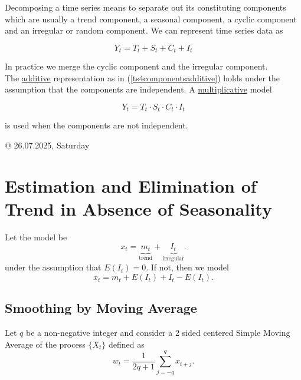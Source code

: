 \documentclass[11pt, a4paper]{article}
\numberwithin{equation}{section}
\theoremstyle{definition}
\begin{document}
Decomposing a time series means to separate out its constituting components which are usually a trend component, a seasonal component, a cyclic component and an irregular or random component. We can represent time series data as

\begin{equation}\label{ts4componentsadditive}
Y_t = T_t + S_t + C_t + I_t
\end{equation}

In practice we merge the cyclic component and the irregular component.\\[0.1em]

The \underline{additive} representation as in (\ref{ts4componentsadditive}) holds under the assumption that the components are independent. A \underline{multiplicative} model

\begin{equation}\label{ts4componentsmultiplicative}
Y_t = T_t \cdot S_t \cdot C_t \cdot I_t
\end{equation}

is used when the components are not independent.

\begin{flushright}
\textcolor{col2}{@ 26.07.2025, Saturday}
\end{flushright}

\newpage
\section{Estimation and Elimination of Trend in Absence of Seasonality}

Let the model be
\begin{equation*}
x_t = \underbrace{m_t}_{\text{trend}} + \underbrace{I_t}_{\text{irregular}}.
\end{equation*}
under the assumption that $E(I_t) = 0$. If not, then we model
\begin{equation*}
x_t = m_t + E(I_t) + I_t - E(I_t).
\end{equation*}

\subsection{Smoothing by Moving Average}

Let $q$ be a non-negative integer and consider a 2 sided centered Simple Moving Average of the process $\{X_t\}$ defined as
\begin{equation*}
w_t = \dfrac{1}{2q+1} \sum \limits_{j = -q}^{q} x_{t+j}.
\end{equation*}
\end{document}
